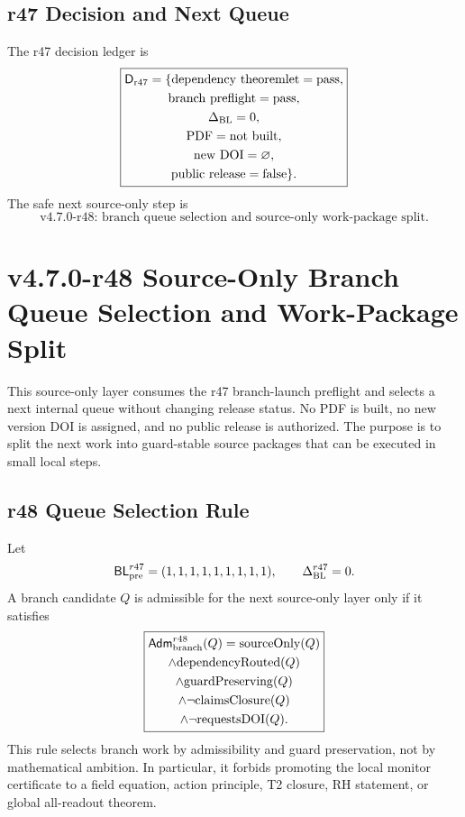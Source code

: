 \subsection{r47 Decision and Next Queue}
\label{subsec:r47-decision-next-queue}

The r47 decision ledger is
\[
\boxed{
\begin{gathered}
\mathsf D_{\rm r47}
=
\{
\mathrm{dependency\ theoremlet}=\mathrm{pass},\\
\mathrm{branch\ preflight}=\mathrm{pass},\\
\Delta_{\rm BL}=0,\\
\mathrm{PDF}=\mathrm{not\ built},\\
\mathrm{new\ DOI}=\varnothing,\\
\mathrm{public\ release}=\mathrm{false}
\}.
\end{gathered}
}
\]
The safe next source-only step is
\[
\boxed{
\text{v4.7.0-r48: branch queue selection and source-only work-package split.}
}
\]


\section{v4.7.0-r48 Source-Only Branch Queue Selection and Work-Package Split}
\label{sec:v470-r48-branch-queue-work-package-split}

This source-only layer consumes the r47 branch-launch preflight and selects a
next internal queue without changing release status.  No PDF is built, no new
version DOI is assigned, and no public release is authorized.  The purpose is to
split the next work into guard-stable source packages that can be executed in
small local steps.

\subsection{r48 Queue Selection Rule}
\label{subsec:r48-queue-selection-rule}

Let
\[
\mathsf{BL}_{\rm pre}^{r47}=(1,1,1,1,1,1,1,1,1),
\qquad
\Delta_{\rm BL}^{r47}=0.
\]
A branch candidate \(Q\) is admissible for the next source-only layer only if it
satisfies
\[
\boxed{
\begin{gathered}
\mathsf{Adm}_{\rm branch}^{r48}(Q)
=
\mathrm{sourceOnly}(Q)
\\\wedge
\mathrm{dependencyRouted}(Q)
\\\wedge
\mathrm{guardPreserving}(Q)
\\\wedge
\neg\mathrm{claimsClosure}(Q)
\\\wedge
\neg\mathrm{requestsDOI}(Q).
\end{gathered}
}
\]
This rule selects branch work by admissibility and guard preservation, not by
mathematical ambition.  In particular, it forbids promoting the local monitor
certificate to a field equation, action principle, T2 closure, RH statement, or
global all-readout theorem.

